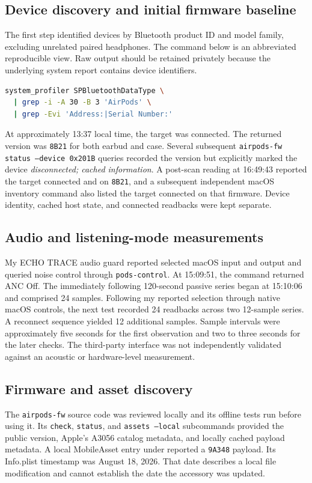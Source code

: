 \documentclass[11pt,letterpaper]{article}
\begin{document}
\subsection{Device discovery and initial firmware baseline}
The first step identified devices by Bluetooth product ID and model family, excluding unrelated paired headphones. The command below is an abbreviated reproducible view. Raw output should be retained privately because the underlying system report contains device identifiers.
\begin{lstlisting}[language=bash]
system_profiler SPBluetoothDataType \
  | grep -i -A 30 -B 3 'AirPods' \
  | grep -Evi 'Address:|Serial Number:'
\end{lstlisting}
At approximately 13:37 local time, the target was connected. The returned version was \texttt{8B21} for both earbud and case. Several subsequent \texttt{airpods-fw status --device 0x201B} queries recorded the version but explicitly marked the device \emph{disconnected; cached information}. A post-scan reading at 16:49:43 reported the target connected and on \texttt{8B21}, and a subsequent independent macOS inventory command also listed the target connected on that firmware. Device identity, cached host state, and connected readbacks were kept separate.

\subsection{Audio and listening-mode measurements}
My ECHO TRACE audio guard reported selected macOS input and output and queried noise control through \texttt{pods-control}. At 15:09:51, the command returned ANC Off. The immediately following 120-second passive series began at 15:10:06 and comprised 24 samples. Following my reported selection through native macOS controls, the next test recorded 24 readbacks across two 12-sample series. A reconnect sequence yielded 12 additional samples. Sample intervals were approximately five seconds for the first observation and two to three seconds for the later checks. The third-party interface was not independently validated against an acoustic or hardware-level measurement.

\subsection{Firmware and asset discovery}
The \texttt{airpods-fw} source code was reviewed locally and its offline tests run before using it. Its \texttt{check}, \texttt{status}, and \texttt{assets --local} subcommands provided the public version, Apple's A3056 catalog metadata, and locally cached payload metadata. A local MobileAsset entry under  reported a \texttt{9A348} payload. Its Info.plist timestamp was August 18, 2026. That date describes a local file modification and cannot establish the date the accessory was updated.
\end{document}
